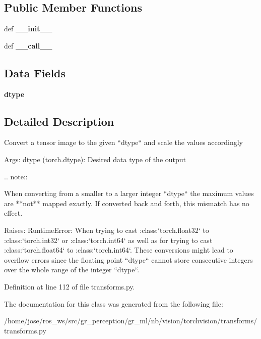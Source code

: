 \subsection*{Public Member Functions}
\begin{DoxyCompactItemize}
\item 
\mbox{\label{classtorchvision_1_1transforms_1_1transforms_1_1ConvertImageDtype_abb27865012489d9dd98e28552dfa2418}} 
def {\bfseries \+\_\+\+\_\+init\+\_\+\+\_\+}
\item 
\mbox{\label{classtorchvision_1_1transforms_1_1transforms_1_1ConvertImageDtype_a6da91368bc1a4230765c0b469ee4a989}} 
def {\bfseries \+\_\+\+\_\+call\+\_\+\+\_\+}
\end{DoxyCompactItemize}
\subsection*{Data Fields}
\begin{DoxyCompactItemize}
\item 
\mbox{\label{classtorchvision_1_1transforms_1_1transforms_1_1ConvertImageDtype_a1da6b6514fb4037f5ea9f418a7cd3a7e}} 
{\bfseries dtype}
\end{DoxyCompactItemize}


\subsection{Detailed Description}
\begin{DoxyVerb}Convert a tensor image to the given ``dtype`` and scale the values accordingly

Args:
    dtype (torch.dtype): Desired data type of the output

.. note::

    When converting from a smaller to a larger integer ``dtype`` the maximum values are **not** mapped exactly.
    If converted back and forth, this mismatch has no effect.

Raises:
    RuntimeError: When trying to cast :class:`torch.float32` to :class:`torch.int32` or :class:`torch.int64` as
        well as for trying to cast :class:`torch.float64` to :class:`torch.int64`. These conversions might lead to
        overflow errors since the floating point ``dtype`` cannot store consecutive integers over the whole range
        of the integer ``dtype``.
\end{DoxyVerb}
 

Definition at line 112 of file transforms.\+py.



The documentation for this class was generated from the following file\+:\begin{DoxyCompactItemize}
\item 
/home/jose/ros\+\_\+ws/src/gr\+\_\+perception/gr\+\_\+ml/nb/vision/torchvision/transforms/transforms.\+py\end{DoxyCompactItemize}
